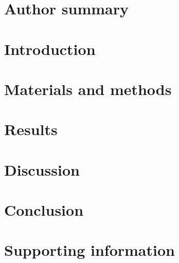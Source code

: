 \documentclass[10pt,letterpaper]{article}
\begin{document}
\section*{Author summary}



\linenumbers

\section*{Introduction}



\section*{Materials and methods}









\section*{Results}







\section*{Discussion}



\section*{Conclusion}


\section*{Supporting information}

\end{document}
